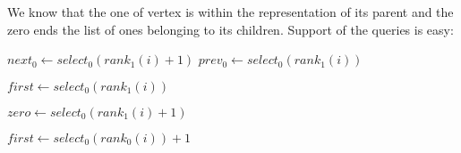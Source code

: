 We know that the one of vertex is within the representation of its parent and the zero ends the list of ones belonging to its children.
Support of the queries is easy:

\begin{algorithmic}
	\State {}
\EndFunction
\end{algorithmic}

\begin{algorithmic}
	\State {} 
\EndFunction
\end{algorithmic}

\begin{algorithmic}
		\State {}
	\Else
		\State {} 
	\EndIf
\EndFunction
\end{algorithmic}

\begin{algorithmic}
	\State $next_0 \gets select_0(rank_1(i) + 1)$ 
	\State $prev_0 \gets select_0(rank_1(i))$ 
	\State {}
\EndFunction
\end{algorithmic}

\begin{algorithmic}
		\State {}
		\State {}
	\Else
		\State $first \gets select_0(rank_1(i))$ 
		\State {}
	\EndIf
\EndFunction
\end{algorithmic}

\begin{algorithmic}
 
		\State {}
	\Else
		\State $zero \gets select_0(rank_1(i) + 1)$ 
		\State {}
	\EndIf
\EndFunction
\end{algorithmic}

\begin{algorithmic}
		\State {}
	\Else
		\State $first \gets select_0(rank_0(i)) + 1$ 
		\State {}
	\EndIf
\EndFunction
\end{algorithmic}

